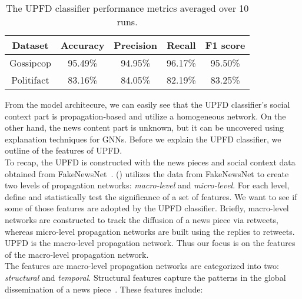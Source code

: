 \begin{table}
    \centering
    \begin{tabular}{c | c | c | c | c}
        \textbf{Dataset} & \textbf{Accuracy} & \textbf{Precision} & \textbf{Recall} & \textbf{F1 score} \\
        \hline
        Gossipcop        & 95.49\%           & 94.95\%            & 96.17\%         & 95.50\%           \\
        \hline
        Politifact       & 83.16\%           & 84.05\%            & 82.19\%         & 83.25\%           \\
    \end{tabular}
    \caption[The UPFD classifier performance metrics averaged over 10 runs.]{The UPFD classifier performance metrics averaged over 10 runs.}
    \label{tab:UPFDClassifier_Results}
\end{table}
From the model architecure, we can easily see that the UPFD classifier's social context part is propagation-based and utilize a homogeneous network. On the other hand, the news content part is unknown, but it can be uncovered using explanation techniques for GNNs. Before we explain the UPFD classifier, we outline of the features of UPFD.\\
To recap, the UPFD is constructed with the news pieces and social context data obtained from FakeNewsNet~\parencite{FakeNewsNet_Shu}. \citeauthor{HierarchicalPropagationNetworksForFND_Shu} (\citeyear{HierarchicalPropagationNetworksForFND_Shu}) utilizes the data from FakeNewsNet to create two levels of propagation networks: \emph{macro-level} and \emph{micro-level}. For each level, ~\citeauthor{HierarchicalPropagationNetworksForFND_Shu} define and statistically test the significance of a set of features. We want to see if some of those features are adopted by the UPFD classifier. Briefly, macro-level networks are constructed to track the diffusion of a news piece via retweets, whereas micro-level propagation networks are built using the replies to retweets. UPFD is the macro-level propagation network. Thus our focus is on the features of the macro-level propagation network.\\
The features are macro-level propagation networks are categorized into two: \emph{structural} and \emph{temporal}. Structural features capture the patterns in the global dissemination of a news piece~\parencite{HierarchicalPropagationNetworksForFND_Shu}. These features include:
